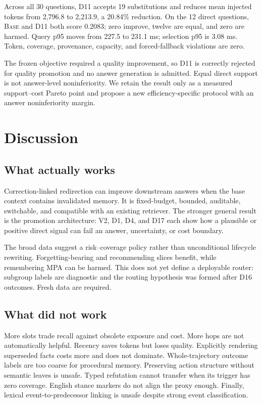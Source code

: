\documentclass[10pt]{article}
\newcommand{\base}{\textsc{Base}\xspace}
\begin{document}
Across all 30 questions, D11 accepts 19 substitutions and reduces mean injected tokens from 2,796.8 to 2,213.9, a 20.84\% reduction. On the 12 direct questions, \base and D11 both score 0.2083; zero improve, twelve are equal, and zero are harmed. Query p95 moves from 227.5 to 231.1 ms; selection p95 is 3.08 ms. Token, coverage, provenance, capacity, and forced-fallback violations are zero.

The frozen objective required a quality improvement, so D11 is correctly rejected for quality promotion and no answer generation is admitted. Equal direct support is not answer-level noninferiority. We retain the result only as a measured support--cost Pareto point and propose a new efficiency-specific protocol with an answer noninferiority margin.

\section{Discussion}

\subsection{What actually works}

Correction-linked redirection can improve downstream answers when the base context contains invalidated memory. It is fixed-budget, bounded, auditable, switchable, and compatible with an existing retriever. The stronger general result is the promotion architecture: V2, D1, D4, and D17 each show how a plausible or positive direct signal can fail an answer, uncertainty, or cost boundary.

The broad data suggest a risk--coverage policy rather than unconditional lifecycle rewriting. Forgetting-bearing and recommending slices benefit, while remembering MPA can be harmed. This does not yet define a deployable router: subgroup labels are diagnostic and the routing hypothesis was formed after D16 outcomes. Fresh data are required.

\subsection{What did not work}

More slots trade recall against obsolete exposure and cost. More hops are not automatically helpful. Recency saves tokens but loses quality. Explicitly rendering superseded facts costs more and does not dominate. Whole-trajectory outcome labels are too coarse for procedural memory. Preserving action structure without semantic leaves is unsafe. Typed refutation cannot transfer when its trigger has zero coverage. English stance markers do not align the proxy enough. Finally, lexical event-to-predecessor linking is unsafe despite strong event classification.
\end{document}
